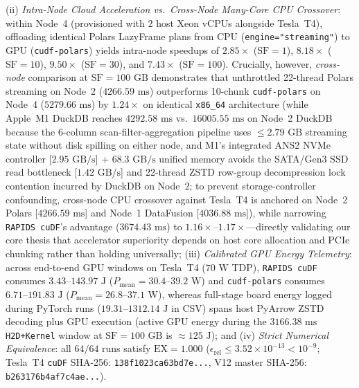 \documentclass[10pt,a4paper]{article}
\begin{document}
(ii) \emph{Intra-Node Cloud Acceleration vs.\ Cross-Node Many-Core CPU Crossover}: within Node~4 (provisioned with 2 host Xeon vCPUs alongside Tesla~T4), offloading identical Polars LazyFrame plans from CPU (\texttt{engine="streaming"}) to GPU (\texttt{cudf-polars}) yields intra-node speedups of $2.85\times$ ($\text{SF}=1$), $8.18\times$ ($\text{SF}=10$), $9.50\times$ ($\text{SF}=30$), and $7.43\times$ ($\text{SF}=100$). Crucially, however, \emph{cross-node} comparison at $\text{SF}=100\text{ GB}$ demonstrates that unthrottled 22-thread Polars streaming on Node~2 ($4266.59\text{ ms}$) outperforms 10-chunk \texttt{cudf-polars} on Node~4 ($5279.66\text{ ms}$) by $1.24\times$ on identical \texttt{x86\_64} architecture (while Apple~M1 DuckDB reaches $4292.58\text{ ms}$ vs.\ $16005.55\text{ ms}$ on Node~2 DuckDB because the 6-column scan-filter-aggregation pipeline uses $\le 2.79\text{ GB}$ streaming state without disk spilling on either node, and M1's integrated ANS2 NVMe controller [$2.95\text{ GB/s}$] + $68.3\text{ GB/s}$ unified memory avoids the SATA/Gen3 SSD read bottleneck [$1.42\text{ GB/s}$] and 22-thread ZSTD row-group decompression lock contention incurred by DuckDB on Node~2; to prevent storage-controller confounding, cross-node CPU crossover against Tesla~T4 is anchored on Node~2 Polars [$4266.59\text{ ms}$] and Node~1 DataFusion [$4036.88\text{ ms}$]), while narrowing \texttt{RAPIDS cuDF}'s advantage ($3674.43\text{ ms}$) to $1.16\times\text{--}1.17\times$---directly validating our core thesis that accelerator superiority depends on host core allocation and PCIe chunking rather than holding universally;
(iii) \emph{Calibrated GPU Energy Telemetry}: across end-to-end GPU windows on Tesla~T4 ($70\text{ W}$ TDP), \texttt{RAPIDS cuDF} consumes $3.43\text{--}143.97\text{ J}$ ($P_{\text{mean}}=30.4\text{--}39.2\text{ W}$) and \texttt{cudf-polars} consumes $6.71\text{--}191.83\text{ J}$ ($P_{\text{mean}}=26.8\text{--}37.1\text{ W}$), whereas full-stage board energy logged during PyTorch runs ($19.31\text{--}1312.14\text{ J}$ in CSV) spans host PyArrow ZSTD decoding plus GPU execution (active GPU energy during the $3166.38\text{ ms}$ \texttt{H2D+Kernel} window at $\text{SF}=100\text{ GB}$ is $\approx 125\text{ J}$); and
(iv) \emph{Strict Numerical Equivalence}: all $64/64$ runs satisfy $\text{EX}=1.000$ ($\epsilon_{\text{rel}} \le 3.52 \times 10^{-13} < 10^{-9}$; Tesla~T4 \texttt{cuDF} SHA-256: \texttt{138f1023ca63bd7e...}, V12 master SHA-256: \texttt{b263176b4af7c4ae...}).
\end{document}
